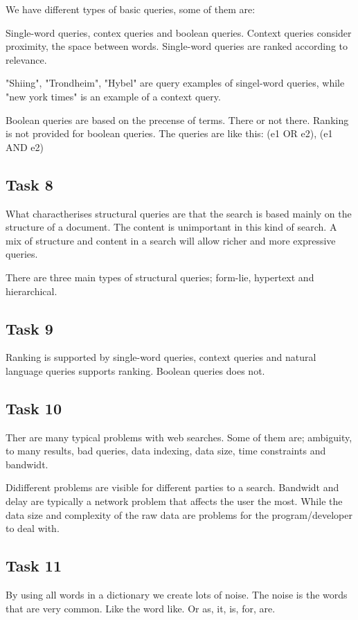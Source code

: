 \documentclass[12pt, a4paper]{article}
\begin{document}
We have different types of basic queries, some of them are: 

Single-word queries, contex queries and boolean queries.
Context queries consider proximity, the space between words.  
Single-word queries are ranked according to relevance. 

"Shiing", "Trondheim", "Hybel" are query examples of singel-word queries, while "new york times" is an example of a context query. 

Boolean queries are based on the precense of terms. There or not there. 
Ranking is not provided for boolean queries. 
The queries are like this: (e1 OR e2), (e1 AND e2)


\subsection{Task 8}
What charactherises structural queries are that the search is based mainly on the structure of a document. 
The content is unimportant in this kind of search. 
A mix of structure and content in a search will allow richer and more expressive queries. 

There are three main types of structural queries; form-lie, hypertext and hierarchical. 

\subsection{Task 9}
Ranking is supported by single-word queries, context queries and natural language queries supports ranking.
Boolean queries does not.

\subsection{Task 10}
Ther are many typical problems with web searches.
Some of them are; ambiguity, to many results, bad queries, data indexing, data size, time constraints and bandwidt. 

Didifferent problems are visible for different parties to a search. Bandwidt and delay are typically a network problem that affects the user the most. 
While the data size and complexity of the raw data are problems for the program/developer to deal with. 

\subsection{Task 11}
By using all words in a dictionary we create lots of noise. The noise is the words that are very common. 
Like the word like. Or as, it, is, for, are. 
\end{document}

